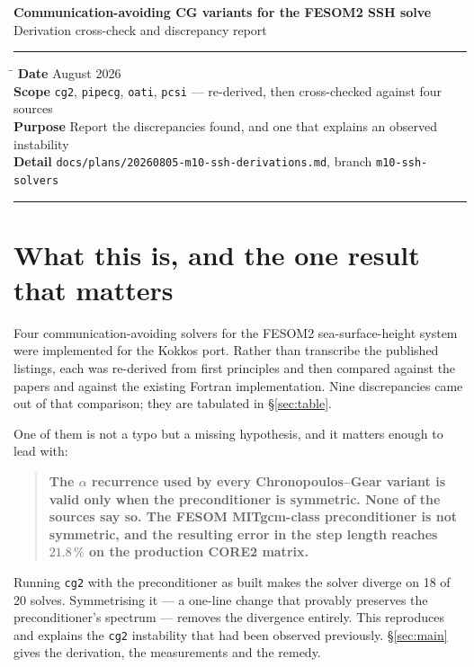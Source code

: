 \documentclass[11pt,a4paper]{article}
\begin{document}
\begin{center}
{\Large\bfseries Communication-avoiding CG variants for the FESOM2 SSH solve}\\[1mm]
{\large Derivation cross-check and discrepancy report}
\end{center}

\vspace{2mm}
\hrule
\vspace{1.5mm}
\begin{tabbing}
\hspace{2.4cm}\=\kill
\textbf{Date}     August 2026\\
\textbf{Scope}   \> \texttt{cg2}, \texttt{pipecg}, \texttt{oati}, \texttt{pcsi} --- re-derived, then
                    cross-checked against four sources\\
\textbf{Purpose} \> Report the discrepancies found, and one that explains an observed instability\\
\textbf{Detail}  \> \texttt{docs/plans/20260805-m10-ssh-derivations.md}, branch
                    \texttt{m10-ssh-solvers}
\end{tabbing}
\vspace{-1mm}
\hrule
\vspace{3mm}

\section{What this is, and the one result that matters}

Four communication-avoiding solvers for the FESOM2 sea-surface-height system were
implemented for the Kokkos port. Rather than transcribe the published listings, each
was re-derived from first principles and then compared against the papers and against
the existing Fortran implementation. Nine discrepancies came out of that comparison;
they are tabulated in \S\ref{sec:table}.

One of them is not a typo but a missing hypothesis, and it matters enough to lead with:

\begin{quote}
\textbf{The $\alpha$ recurrence used by every Chronopoulos--Gear variant is valid only
when the preconditioner is symmetric. None of the sources say so. The FESOM
MITgcm-class preconditioner is not symmetric, and the resulting error in the step
length reaches $21.8\,\%$ on the production CORE2 matrix.}
\end{quote}

\noindent
Running \texttt{cg2} with the preconditioner as built makes the solver diverge on 18 of
20 solves. Symmetrising it --- a one-line change that provably preserves the
preconditioner's spectrum --- removes the divergence entirely. This reproduces and
explains the \texttt{cg2} instability that had been observed previously.
\S\ref{sec:main} gives the derivation, the measurements and the remedy.
\end{document}
